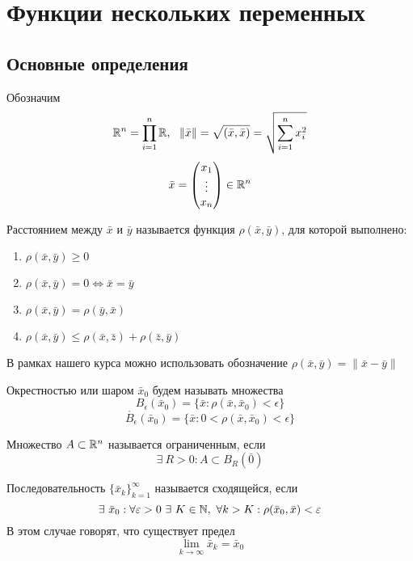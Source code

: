 \newpage
\section{Функции нескольких переменных}
\subsection{Основные определения}
Обозначим
\[\R^n=\prod\limits_{i=1}^{n}\R,\ \ \|\bar{x}\|=\sqrt{(\bar{x},\bar{x})}=\sqrt{\sum\limits_{i=1}^{n}x_i^2}\]
\[\bar{x}=\begin{pmatrix}
    x_1\\
    \vdots\\
    x_n
\end{pmatrix}\in \mathbb{R}^n\]
\begin{definition}
    Расстоянием между $\bar{x}$ и $\bar{y}$ называется функция $\rho(\bar{x}, \bar{y})$, для которой выполнено:
    \begin{enumerate}
        \item $\rho(\bar{x}, \bar{y})\geq 0$
        \item $\rho(\bar{x}, \bar{y})=0 \Leftrightarrow \bar{x}=\bar{y}$
        \item $\rho(\bar{x}, \bar{y})=\rho(\bar{y}, \bar{x})$
        \item $\rho(\bar{x}, \bar{y})\leq \rho(\bar{x}, \bar{z})+\rho(\bar{z}, \bar{y})$
    \end{enumerate}
    В рамках нашего курса можно использовать обозначение $\rho(\bar{x}, \bar{y})=\|\bar{x}-\bar{y}\|$
\end{definition} 
\begin{definition} Окрестностью или шаром $\bar{x}_0$ будем называть множества\\
    \[B_{\epsilon}(\bar{x}_0)=\{\bar{x}: \rho(\bar{x}, \bar{x}_0)<\epsilon\}\]
    \[\mathring{B_{\epsilon}}(\bar{x}_0)=\{\bar{x}: 0<\rho(\bar{x}, \bar{x}_0)<\epsilon\}\]
\end{definition}
\begin{definition}
    Множество $A\subset \mathbb{R}^n$ называется ограниченным, если 
    \[\exists\ R>0: A\subset B_{R}(\bar{0})\]
\end{definition}
\begin{definition}
    Последовательность $\{\bar{x}_k\}_{k=1}^{\infty}$ называется сходящейся, если 
    \[\exists\ \bar{x}_0: \forall \epsilon>0\ \exists\ K\in \N,\ \forall k>K: \rho(\bar{x}_0, \bar{x})<\epsilon\]
    В этом случае говорят, что существует предел
    \[\lim\limits_{k\to \infty}\bar{x}_k=\bar{x}_0\]
\end{definition} 
